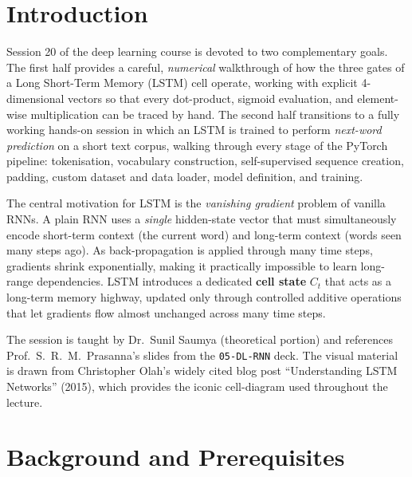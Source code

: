 \documentclass[12pt,a4paper]{article}
\begin{document}
\tableofcontents
\newpage

\section{Introduction}
\label{sec:intro}

Session 20 of the deep learning course is devoted to two complementary goals.
The first half provides a careful, \emph{numerical} walkthrough of how the three
gates of a Long Short-Term Memory (LSTM) cell operate, working with explicit
4-dimensional vectors so that every dot-product, sigmoid evaluation, and
element-wise multiplication can be traced by hand.
The second half transitions to a fully working hands-on session in which an
LSTM is trained to perform \emph{next-word prediction} on a short text corpus,
walking through every stage of the PyTorch pipeline: tokenisation, vocabulary
construction, self-supervised sequence creation, padding, custom dataset and
data loader, model definition, and training.

\begin{keyinsight}
  The central motivation for LSTM is the \emph{vanishing gradient} problem of
  vanilla RNNs.  A plain RNN uses a \emph{single} hidden-state vector that must
  simultaneously encode short-term context (the current word) and long-term
  context (words seen many steps ago).  As back-propagation is applied through
  many time steps, gradients shrink exponentially, making it practically
  impossible to learn long-range dependencies.
  LSTM introduces a dedicated \textbf{cell state} $C_t$ that acts as a
  long-term memory highway, updated only through controlled additive operations
  that let gradients flow almost unchanged across many time steps.
\end{keyinsight}

The session is taught by Dr.\ Sunil Saumya (theoretical portion) and references
Prof.\ S.\ R.\ M.\ Prasanna's slides from the \texttt{05-DL-RNN} deck.
The visual material is drawn from Christopher Olah's widely cited blog post
``Understanding LSTM Networks'' (2015), which provides the iconic cell-diagram
used throughout the lecture.

\section{Background and Prerequisites}
\label{sec:background}
\end{document}

